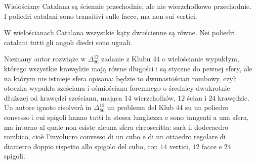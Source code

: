 \begin{proposition}
    Wielościany Catalana są ściennie przechodnie, ale nie wierzchołkowo przechodnie. %
    I poliedri catalani sono transitivi sulle facce, ma non sui vertici. %
\end{proposition}

\begin{proposition}
    W wielościanach Catalana wszystkie kąty dwuścienne są równe. %
    Nei poliedri catalani tutti gli angoli diedri sono uguali. %
\end{proposition}

Nieznany autor rozwiąże w $\Delta_{86}^{12}$ zadanie z Klubu 44 o wielościanie wypukłym, którego wszystkie krawędzie mają równe długości i są styczne do pewnej sfery, ale na którym nie istnieje sfera opisana: będzie to dwunastościan rombowy, czyli otoczka wypukła sześcianu i ośmiościanu foremnego o średnicy dwukrotnie dłuższej od krawędzi sześcianu, mająca $14$ wierzchołków, $12$ ścian i $24$ krawędzie. %
Un autore ignoto risolverà in $\Delta_{86}^{12}$ un problema del Klub 44 su un poliedro convesso i cui spigoli hanno tutti la stessa lunghezza e sono tangenti a una sfera, ma intorno al quale non esiste alcuna sfera circoscritta: sarà il dodecaedro rombico, cioè l'involucro convesso di un cubo e di un ottaedro regolare di diametro doppio rispetto allo spigolo del cubo, con $14$ vertici, $12$ facce e $24$ spigoli. %

%
